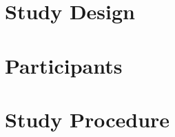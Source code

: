 \documentclass[logo,msc]{infthesis}
\begin{document}
\section{Study Design}
%
%
%
%
%
%

\section{Participants}

\section{Study Procedure}
\end{document}
